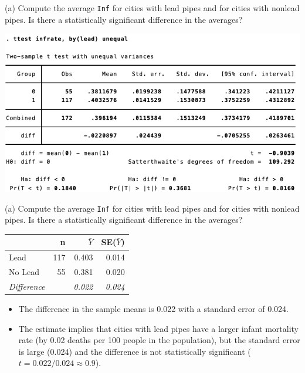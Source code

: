\documentclass[
  10pt,
  ignorenonframetext,
]{beamer}
\begin{document}
\begin{frame}{(a) Compute the average \texttt{Inf} for cities with lead
pipes and for cities with nonlead pipes. Is there a statistically
significant difference in the averages?}
\protect\hypertarget{a-compute-the-average-inf-for-cities-with-lead-pipes-and-for-cities-with-nonlead-pipes.-is-there-a-statistically-significant-difference-in-the-averages-1}{}
\footnotesize

\begin{center}\includegraphics[width=1\linewidth]{pictures/ex1-res1-ttestLead} \end{center}
\end{frame}

\begin{frame}{(a) Compute the average \texttt{Inf} for cities with lead
pipes and for cities with nonlead pipes. Is there a statistically
significant difference in the averages?}
\protect\hypertarget{a-compute-the-average-inf-for-cities-with-lead-pipes-and-for-cities-with-nonlead-pipes.-is-there-a-statistically-significant-difference-in-the-averages-2}{}
\begin{table}[]
\centering
\begin{tabular}{|l|r|r|r|}
\hline
                             & n & $\bar{Y}$ & SE($\bar{Y}$) \\ \hline
Lead    & 117 & 0.403 & 0.014 \\ \hline
No Lead & 55  & 0.381 & 0.020 \\ \hline
\textit{Difference} &            & \textit{0.022}                    & \textit{0.024}                        \\ \hline
\end{tabular}
\end{table}

\small

\begin{itemize}
\item
  The difference in the sample means is 0.022 with a standard error of
  0.024. \vspace{0.8mm}
\item
  The estimate implies that cities with lead pipes have a larger infant
  mortality rate (by 0.02 deaths per 100 people in the population), but
  the standard error is large (0.024) and the difference is not
  statistically significant (\(t = 0.022/0.024 \approx 0.9\)).
\end{itemize}
\end{frame}
\end{document}

